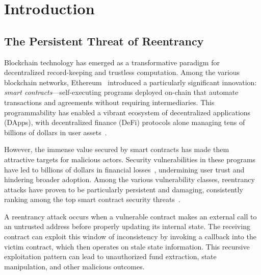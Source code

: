 \chapter{Introduction}
\label{ch:introduction}

\section{The Persistent Threat of Reentrancy}
\label{sec:intro-threat}

Blockchain technology has emerged as a transformative paradigm for decentralized record-keeping and trustless computation. Among the various blockchain networks, Ethereum~\cite{ethereum-whitepaper} introduced a particularly significant innovation: \textit{smart contracts}---self-executing programs deployed on-chain that automate transactions and agreements without requiring intermediaries. This programmability has enabled a vibrant ecosystem of decentralized applications (DApps), with decentralized finance (DeFi) protocols alone managing tens of billions of dollars in user assets~\cite{coingecko}.

However, the immense value secured by smart contracts has made them attractive targets for malicious actors. Security vulnerabilities in these programs have led to billions of dollars in financial losses~\cite{top-smart-contract-attacks, top-smart-contract-attacks-2025}, undermining user trust and hindering broader adoption. Among the various vulnerability classes, reentrancy attacks have proven to be particularly persistent and damaging, consistently ranking among the top smart contract security threats~\cite{top-smart-contract-attacks}.

A reentrancy attack occurs when a vulnerable contract makes an external call to an untrusted address before properly updating its internal state. The receiving contract can exploit this window of inconsistency by invoking a callback into the victim contract, which then operates on stale state information. This recursive exploitation pattern can lead to unauthorized fund extraction, state manipulation, and other malicious outcomes.


